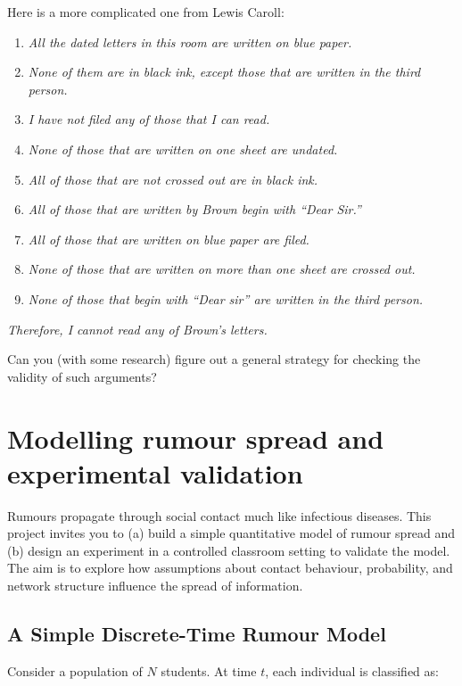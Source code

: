 \documentclass[11pt]{article}
\begin{document}
\vspace{0.25in}
Here is a more complicated one  from Lewis Caroll:

\begin{enumerate}
\item \emph{All the dated letters in this room are written on blue paper.}
\item  \emph{None of them are in black ink, except those that are written in the third person. }
\item  \emph{I have not filed any of those that I can read.}
\item  \emph{None of those that are written on one sheet are undated.}
\item  \emph{All of those that are not crossed out are in black ink.}
\item  \emph{All of those that are written by Brown begin with “Dear Sir.”}
\item  \emph{All of those that are written on blue paper are filed.}
\item  \emph{None of those that are written on more than one sheet are crossed out.}
\item  \emph{None of those that begin with “Dear sir” are written in the third person. }
\end{enumerate}

\emph{Therefore, I cannot read any of Brown’s letters. }

\vspace{0.25in}
Can you (with some research) figure out a  general strategy for checking the validity of such arguments?

\section{Modelling rumour spread and experimental validation}

Rumours propagate through social contact much like infectious diseases.
This project invites you to (a) build a simple quantitative model of
rumour spread and (b) design an experiment in a controlled classroom
setting to validate the model. The aim is to explore how assumptions
about contact behaviour, probability, and network structure influence
the spread of information.

\subsection*{A Simple Discrete-Time Rumour Model}

Consider a population of $N$ students. At time $t$, each individual is
classified as:
\end{document}

